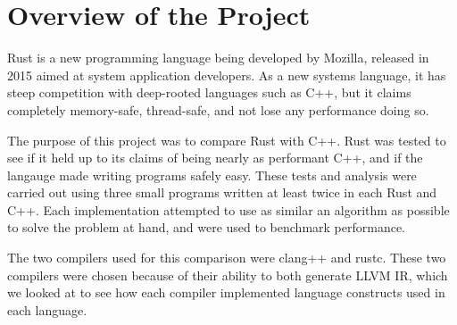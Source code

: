 \chapter{Overview of the Project}
\par Rust is a new programming language being developed by Mozilla, released in 2015
aimed at system application developers. As a new systems language, it has steep
competition with deep-rooted languages such as C++, but it claims completely
memory-safe, thread-safe, and not lose any performance doing so.

\par The purpose of this project was to compare Rust with C++. Rust
was tested to see if it held up to its claims of being nearly as performant C++,
and if the langauge made writing programs safely easy. These tests and analysis
were carried out using three small programs written at least twice in each Rust and C++. Each
implementation attempted to use as similar an algorithm as possible to solve
the problem at hand, and were used to benchmark performance.

\par The two compilers used for this comparison were clang++ and rustc.
These two compilers were chosen because of their ability to both generate LLVM
IR, which we looked at to see how each compiler implemented language constructs
used in each language. 
